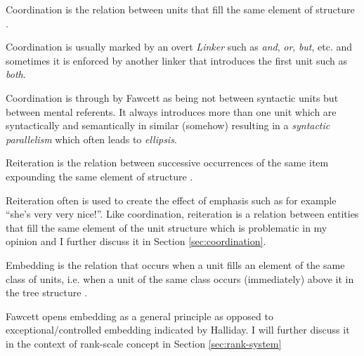 \begin{definition}[Coordination]\label{def:coordination}
	Coordination is the relation between units that fill the same element of structure \citep[p.263]{Fawcett2000}. 
\end{definition}

Coordination is usually marked by an overt \textit{Linker} such as \textit{and}, \textit{or}, \textit{but}, etc. and sometimes it is enforced by another linker that introduces the first unit such as \textit{both}. 

Coordination is through by Fawcett as being not between syntactic units but between mental referents. It always introduces more than one unit which are syntactically and semantically in similar (somehow) resulting in a \textit{syntactic parallelism} which often leads to \textit{ellipsis}.

\begin{definition}[Reiteration]\label{def:reiteration}
	Reiteration is the relation between successive occurrences of the same item expounding the same element of structure  \citep[p.271]{Fawcett2000}. 
\end{definition}

Reiteration often is used to create the effect of emphasis such as for example ``she's very very nice!''. Like coordination, reiteration is a relation between entities that fill the same element of the unit structure which is problematic in my opinion and I further discuss it in Section \ref{sec:coordination}.

\begin{definition}[Embedding]\label{def:embedding}
	Embedding is the relation that occurs when a unit fills an element of the same class of units, i.e. when a unit of the same class occurs (immediately) above it in the tree structure \citep[p.264]{Fawcett2000}. 
\end{definition}

Fawcett opens embedding as a general principle as opposed to exceptional/controlled embedding indicated by Halliday. I will further discuss it in the context of rank-scale concept in Section \ref{sec:rank-system}

